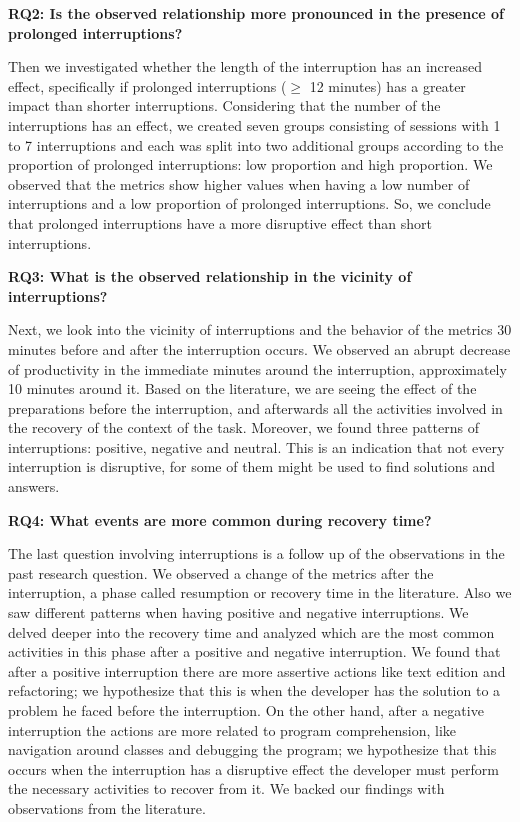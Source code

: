 \textbf{RQ2: Is the observed relationship more pronounced in the presence of prolonged interruptions?}

Then we investigated whether the length of the interruption has an increased effect, specifically if prolonged interruptions ($\geq$ 12 minutes) has a greater impact than shorter interruptions. Considering that the number of the interruptions has an effect, we created seven groups consisting of sessions with 1 to 7 interruptions and each was split into two additional groups according to the proportion of prolonged interruptions: low proportion and high proportion. We observed that the metrics show higher values when having a low number of interruptions and a low proportion of prolonged interruptions. So, we conclude that prolonged interruptions have a more disruptive effect than short interruptions.

\textbf{RQ3: What is the observed relationship in the vicinity of interruptions?}

Next, we look into the vicinity of interruptions and the behavior of the metrics 30 minutes before and after the interruption occurs. We observed an abrupt decrease of productivity in the immediate minutes around the interruption, approximately 10 minutes around it. Based on the literature, we are seeing the effect of the preparations before the interruption, and afterwards all the activities involved in the recovery of the context of the task. Moreover, we found three patterns of interruptions: positive, negative and neutral. This is an indication that not every interruption is disruptive, for some of them might be used to find solutions and answers.

\textbf{RQ4: What events are more common during recovery time?}

The last question involving interruptions is a follow up of the observations in the past research question. We observed a change of the metrics after the interruption, a phase called resumption or recovery time in the literature. Also we saw different patterns when having positive and negative interruptions. We delved deeper into the recovery time and analyzed which are the most common activities in this phase after a positive and negative interruption. We found that after a positive interruption there are more assertive actions like text edition and refactoring; we hypothesize that this is when the developer has the solution to a problem he faced before the interruption. On the other hand, after a negative interruption the actions are more related to program comprehension, like navigation around classes and debugging the program; we hypothesize that this occurs when the interruption has a disruptive effect the developer must perform the necessary activities to recover from it. We backed our findings with observations from the literature.


